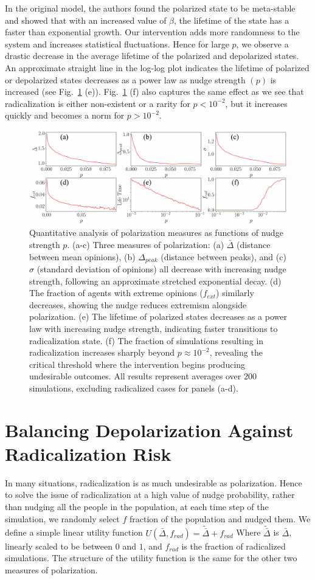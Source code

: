 In the original model, the authors found the polarized state to be meta-stable and showed that with an increased value of $\beta$, the lifetime of the state has a faster than exponential growth. Our intervention adds more randomness to the system and increases statistical fluctuations. Hence for large $p$, we observe a drastic decrease in the average lifetime of the polarized and depolarized states. An approximate straight line in the log-log plot indicates the lifetime of polarized or depolarized states decreases as a power law as nudge strength $(p)$ is increased (see Fig.~\ref{fig:pol_par} (e)). Fig.~\ref{fig:pol_par} (f) also captures the same effect as we see that radicalization is either non-existent or a rarity for $p < 10^{-2}$, but it increases quickly and becomes a norm for $p > 10^{-2}$.
\begin{figure}[H]
    \centering
    \includegraphics[width=\textwidth]{chapters/chapter2/parameters_vs_nudge.pdf}
    \caption{Quantitative analysis of polarization measures as functions of nudge strength $p$. (a-c) Three measures of polarization: (a) $\bar\Delta$ (distance between mean opinions), (b) $\Delta_{peak}$ (distance between peaks), and (c) $\sigma$ (standard deviation of opinions) all decrease with increasing nudge strength, following an approximate stretched exponential decay. (d) The fraction of agents with extreme opinions ($f_{ext}$) similarly decreases, showing the nudge reduces extremism alongside polarization. (e) The lifetime of polarized states decreases as a power law with increasing nudge strength, indicating faster transitions to radicalization state. (f) The fraction of simulations resulting in radicalization increases sharply beyond $p \approx 10^{-2}$, revealing the critical threshold where the intervention begins producing undesirable outcomes. All results represent averages over 200 simulations, excluding radicalized cases for panels (a-d).}
    \label{fig:pol_par}
\end{figure}
\section{Balancing Depolarization Against Radicalization Risk}
In many situations, radicalization is as much undesirable as polarization. Hence to solve the issue of radicalization at a high value of nudge probability, rather than nudging all the people in the population, at each time step of the simulation, we randomly select $f$ fraction of the population and nudged them. We define a simple linear utility function $U(\bar \Delta, f_{rad}) = \tilde{\bar \Delta} + f_{rad}$
Where $\tilde{\bar \Delta}$ is $\bar \Delta$, linearly scaled to be between $0$ and $1$, and $f_{rad}$ is the fraction of radicalized
simulations. The structure of the utility function is the same for the other two measures of polarization.
